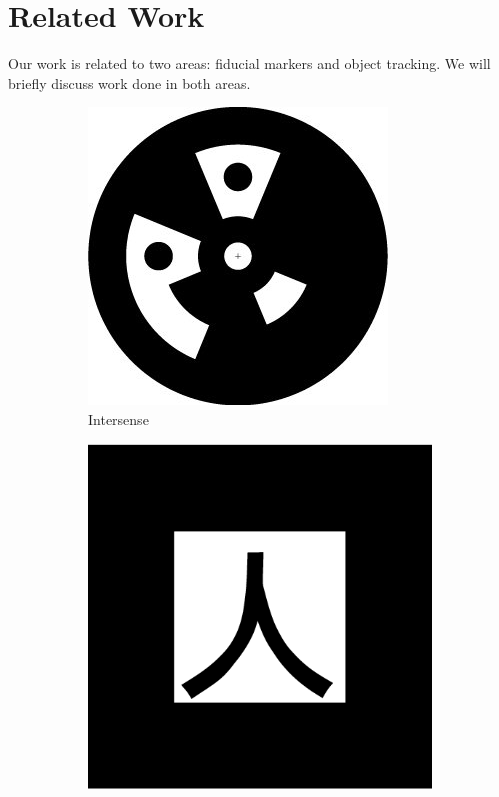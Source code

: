 \documentclass[runningheads]{llncs}
\begin{document}
\section{Related Work}
Our work is related to two areas: fiducial markers and
object tracking. We will briefly discuss work done in both areas.
\begin{figure}
 \begin{subfigure}[b]{0.19\textwidth}
  \centering
  \includegraphics[width=\linewidth]{intersense.jpg}
  Intersense\cite{NaimarkF02}
 \end{subfigure}
 \begin{subfigure}[b]{0.19\textwidth}
 \centering
  \includegraphics[width=\linewidth]{pattKanji.pdf}

\end{subfigure}
\end{figure}
\end{document}
